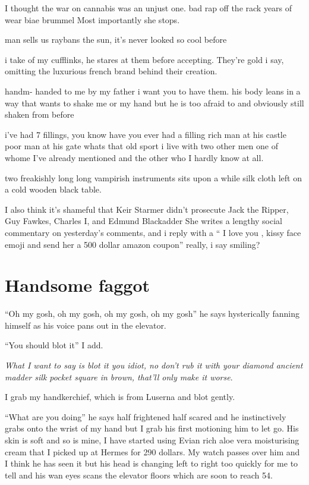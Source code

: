 \documentclass[19pt,openany]{book}
\begin{document}
I thought the war on cannabis was an unjust one.
bad rap
off the rack
years of wear
biae brummel
Most importantly she stops.

man sells us raybans
the sun, it's never
looked so cool before

i take of my cufflinks, he stares at them before
accepting.
They're gold i say,
omitting the luxurious
french brand behind their
creation.

handm- handed to me by my
father i want you to have them.
his body leans in a way that
wants to shake me or my hand
but he is too afraid to and
obviously still shaken from before


i've had 7 fillings, you know
have you ever had a filling
rich man at his castle
poor man at his gate
whats that old sport
i live with two other
men one of whome
I've already mentioned
and the other who I hardly
know at all.

two freakishly long long
vampirish instruments
sits
upon a while
silk cloth
left on a cold wooden
black table.

I also think it’s shameful that Keir Starmer didn’t prosecute Jack the Ripper, Guy Fawkes, Charles I, and Edmund Blackadder
She writes a lengthy
social commentary
on yesterday's comments,
and i reply with a ``
I love you , kissy face emoji
and send her a 500 dollar
amazon coupon''
really, i say smiling?
\chapter{Handsome faggot}
``Oh my gosh, oh my gosh, oh my gosh,
oh my gosh'' he says hysterically
fanning himself as his voice pans
out in the elevator.

``You should blot it'' I add.

\textit{What I
want to say is blot it you idiot, no don't
rub it with your diamond ancient madder silk pocket square
in brown, that'll only make it worse}.

I grab my handkerchief, which is
from Luserna and blot gently.

``What are you doing'' he says half frightened
half scared and he instinctively grabs onto
the wrist of my hand but I grab
his first motioning him to let go.
His skin is soft and so is mine, I have
started using Evian rich aloe vera moisturising
cream that I picked up at Hermes for 290 dollars.
My watch passes over him and I think he has seen it
but his head is changing left to right
too quickly for me to tell and his wan
eyes scans the elevator floors which are
soon to reach 54.
\end{document}
